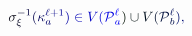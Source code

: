 \documentclass[12pt]{article}
\begin{document}
\makeatletter
\renewcommand*{\@textcolor}[3]{%
  \protect\leavevmode
  \begingroup
    \color#1{#2}#3%
  \endgroup
}
\makeatother
\begin{displaymath}
\mathcolor[RGB]{0,0,15}{\sigma} _ { \mathcolor[RGB]{0,0,30}{\xi} } ^ { \mathcolor[RGB]{0,0,45}{-} \mathcolor[RGB]{0,0,60}{1} } \mathcolor[RGB]{0,0,75}{(} \mathcolor[RGB]{0,0,90}{\kappa} _ { \mathcolor[RGB]{0,0,105}{a} } ^ { \mathcolor[RGB]{0,0,120}{\ell} \mathcolor[RGB]{0,0,135}{+} \mathcolor[RGB]{0,0,150}{1} } \mathcolor[RGB]{0,0,165}{)} \mathcolor[RGB]{0,0,180}{\in} \mathcolor[RGB]{0,0,195}{V} \mathcolor[RGB]{0,0,210}{(} \mathcal { \mathcolor[RGB]{0,0,225}{P} } _ { \mathcolor[RGB]{0,0,240}{a} } ^ { \mathcolor[RGB]{0,0,255}{\ell} } \mathcolor[RGB]{0,15,0}{)} \mathcolor[RGB]{0,15,15}{\cup} \mathcolor[RGB]{0,15,30}{V} \mathcolor[RGB]{0,15,45}{(} \mathcal { \mathcolor[RGB]{0,15,60}{P} } _ { \mathcolor[RGB]{0,15,75}{b} } ^ { \mathcolor[RGB]{0,15,90}{\ell} } \mathcolor[RGB]{0,15,105}{)} \mathcolor[RGB]{0,15,120}{,}
\end{displaymath}
\end{document}
